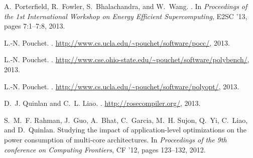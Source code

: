 \documentclass{sig-alternate}
\begin{document}
\begin{thebibliography}{10}
A.~Porterfield, R.~Fowler, S.~Bhalachandra, and W.~Wang.                         
.             
\newblock In {\em Proceedings of the 1st International Workshop on Energy        
  Efficient Supercomputing}, E2SC '13, pages 7:1--7:8, 2013.                     
                                                                                 
L.-N. Pouchet.                                                                   
.                            
\newblock \url{http://www.cs.ucla.edu/~pouchet/software/pocc/}, 2013.            
                                                                                 
L.-N. Pouchet.                                                                   
.                                                           
\newblock \url{http://www.cse.ohio-state.edu/~pouchet/software/polybench/},      
  2013.                                                                          
\balancecolumns
                                                                                 
L.-N. Pouchet.                                                                   
.             
\newblock \url{http://www.cs.ucla.edu/~pouchet/software/polyopt/}, 2013.         
                                                                                 
D.~J. Quinlan and C.~L. Liao.                                                    
.                                                       
\newblock \url{http://rosecompiler.org/}, 2013.    

S.~M.~F. Rahman, J.~Guo, A.~Bhat, C.~Garcia, M.~H. Sujon, Q.~Yi, C.~Liao, and    
  D.~Quinlan.                                                                    
\newblock Studying the impact of application-level optimizations on the power    
  consumption of multi-core architectures.                                       
\newblock In {\em Proceedings of the 9th conference on Computing Frontiers}, CF  
  '12, pages 123--132, 2012.                                                     
                                                                                 

\end{thebibliography}
\end{document}
